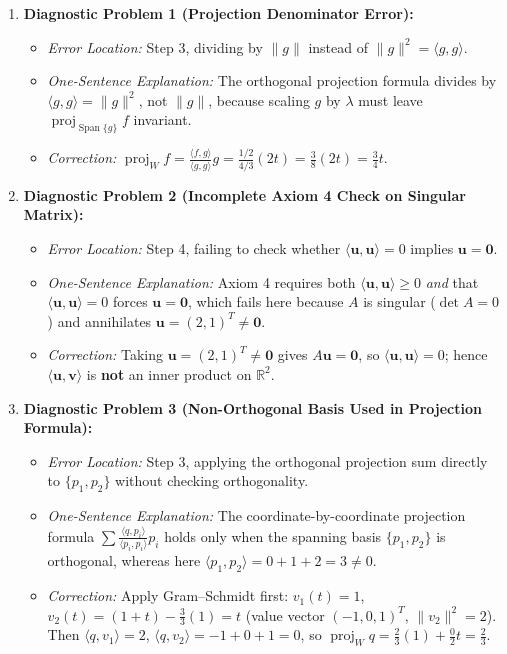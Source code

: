 \documentclass[11pt, letterpaper]{article}
\theoremstyle{definition}
\theoremstyle{remark}
\begin{document}
\begin{enumerate}
    \item \textbf{Diagnostic Problem 1 (Projection Denominator Error):}
    \begin{itemize}
        \item \emph{Error Location:} Step 3, dividing by $\|g\|$ instead of $\|g\|^2 = \langle g, g \rangle$.
        \item \emph{One-Sentence Explanation:} The orthogonal projection formula divides by $\langle g, g \rangle = \|g\|^2$, not $\|g\|$, because scaling $g$ by $\lambda$ must leave $\operatorname{proj}_{\operatorname{Span}\{g\}} f$ invariant.
        \item \emph{Correction:} $\displaystyle \operatorname{proj}_W f = \frac{\langle f, g \rangle}{\langle g, g \rangle}g = \frac{1/2}{4/3}(2t) = \frac{3}{8}(2t) = \frac{3}{4}t$.
    \end{itemize}

    \item \textbf{Diagnostic Problem 2 (Incomplete Axiom 4 Check on Singular Matrix):}
    \begin{itemize}
        \item \emph{Error Location:} Step 4, failing to check whether $\langle \mathbf{u}, \mathbf{u} \rangle = 0$ implies $\mathbf{u} = \mathbf{0}$.
        \item \emph{One-Sentence Explanation:} Axiom 4 requires both $\langle \mathbf{u}, \mathbf{u} \rangle \ge 0$ \emph{and} that $\langle \mathbf{u}, \mathbf{u} \rangle = 0$ forces $\mathbf{u} = \mathbf{0}$, which fails here because $A$ is singular ($\det A = 0$) and annihilates $\mathbf{u} = (2, 1)^T \ne \mathbf{0}$.
        \item \emph{Correction:} Taking $\mathbf{u} = (2, 1)^T \ne \mathbf{0}$ gives $A\mathbf{u} = \mathbf{0}$, so $\langle \mathbf{u}, \mathbf{u} \rangle = 0$; hence $\langle \mathbf{u}, \mathbf{v} \rangle$ is \textbf{not} an inner product on $\mathbb{R}^2$.
    \end{itemize}

    \item \textbf{Diagnostic Problem 3 (Non-Orthogonal Basis Used in Projection Formula):}
    \begin{itemize}
        \item \emph{Error Location:} Step 3, applying the orthogonal projection sum directly to $\{p_1, p_2\}$ without checking orthogonality.
        \item \emph{One-Sentence Explanation:} The coordinate-by-coordinate projection formula $\sum \frac{\langle q, p_i \rangle}{\langle p_i, p_i \rangle}p_i$ holds only when the spanning basis $\{p_1, p_2\}$ is orthogonal, whereas here $\langle p_1, p_2 \rangle = 0 + 1 + 2 = 3 \ne 0$.
        \item \emph{Correction:} Apply Gram--Schmidt first: $v_1(t) = 1$, $v_2(t) = (1+t) - \frac{3}{3}(1) = t$ (value vector $(-1, 0, 1)^T$, $\|v_2\|^2 = 2$). Then $\langle q, v_1 \rangle = 2$, $\langle q, v_2 \rangle = -1 + 0 + 1 = 0$, so $\displaystyle \operatorname{proj}_W q = \frac{2}{3}(1) + \frac{0}{2}t = \frac{2}{3}$.
    \end{itemize}


\end{enumerate}
\end{document}
